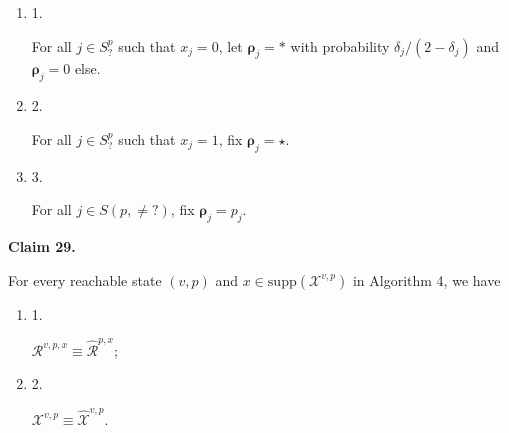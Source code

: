 \begin{enumerate}


\item[] 
1. 


For all $j\in S^{p}_{\mathord{?}}$ such that $x_{j}=0$, let $\bm{\rho}_{j}=*$ with probability $\delta_{j}/(2-\delta_{j})$ and $\bm{\rho}_{j}=0$ else.\par





\item[] 
2. 


For all $j\in S^{p}_{\mathord{?}}$ such that $x_{j}=1$, fix $\bm{\rho}_{j}=\star$.\par





\item[] 
3. 


For all $j\in S(p,\neq\mathord{?})$, fix $\bm{\rho}_{j}=p_{j}$.\par





\end{enumerate}





\par\medskip\noindent\textbf{
Claim 29. 
}\par



For every reachable state $(v,p)$ and $x\in\mathrm{supp}(\mathcal{X}^{v,p})$ in Algorithm 4, we have\par


\begin{enumerate}


\item[] 
1. 


$\mathcal{R}^{v,p,x}\equiv\widehat{\mathcal{R}}^{p,x}$;\par





\item[] 
2. 


$\mathcal{X}^{v,p}\equiv\widehat{\mathcal{X}}^{v,p}$.\par





\end{enumerate}



